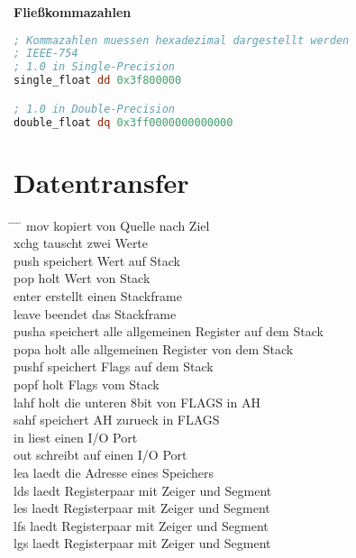 \documentclass[a4paper,12pt,twoside]{article}
\begin{document}
\textbf{Fließkommazahlen}
\begin{center}
\begin{minipage}{1.0\textwidth}
  \begin{lstlisting}[language=NASM]
; Kommazahlen muessen hexadezimal dargestellt werden 
; IEEE-754
; 1.0 in Single-Precision
single_float dd 0x3f800000 

; 1.0 in Double-Precision 
double_float dq 0x3ff0000000000000
  \end{lstlisting}
\end{minipage}
\end{center}
\section{Datentransfer}
\begin{tabbing}
  \= \hspace{2mm} \= \hspace{50mm} \= \kill 
  \> mov \> kopiert von Quelle nach Ziel \\ 
  \> xchg \> tauscht zwei Werte \\ 
  \> push \> speichert Wert auf Stack \\ 
  \> pop \> holt Wert von Stack \\ 
  \> enter \> erstellt einen Stackframe \\ 
  \> leave \> beendet das Stackframe \\
  \> pusha \> speichert alle allgemeinen Register auf dem Stack \\ 
  \> popa \> holt alle allgemeinen Register von dem Stack \\ 
  \> pushf \> speichert Flags auf dem Stack \\ 
  \> popf \> holt Flags vom Stack \\ 
  \> lahf \> holt die unteren 8bit von FLAGS in AH \\ 
  \> sahf \> speichert AH zurueck in FLAGS \\ 
  \> in \> liest einen I/O Port \\ 
  \> out \> schreibt auf einen I/O Port \\ 
  \> lea \> laedt die Adresse eines Speichers \\ 
  \> lds \> laedt Registerpaar mit Zeiger und Segment \\ 
  \> les \> laedt Registerpaar mit Zeiger und Segment \\ 
  \> lfs \> laedt Registerpaar mit Zeiger und Segment \\ 
  \> lgs \> laedt Registerpaar mit Zeiger und Segment \\ 

\end{tabbing}
\end{document}
